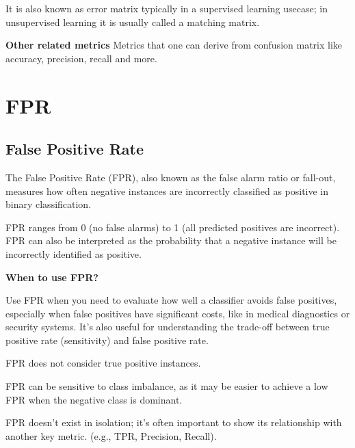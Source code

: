 {It is also known as error matrix typically in a supervised learning usecase; in unsupervised learning it is usually called a matching matrix. 
}

\textbf{Other related metrics}
Metrics that one can derive from confusion matrix like accuracy, precision, recall and more. 




\clearpage
\section{FPR}
\subsection{False Positive Rate}
\thispagestyle{classificationstyle}

The False Positive Rate (FPR), also known as the false alarm ratio or fall-out, measures how often negative instances are incorrectly classified as positive in binary classification.

\begin{center}
\end{center}

FPR ranges from 0 (no false alarms) to 1 (all predicted positives are incorrect). FPR can also be interpreted as the probability that a negative instance will be incorrectly identified as positive.

\textbf{When to use FPR?}

Use FPR when you need to evaluate how well a classifier avoids false positives, especially when false positives have significant costs, like in medical diagnostics or security systems. It's also useful for understanding the trade-off between true positive rate (sensitivity) and false positive rate.

{
\item FPR does not consider true positive instances.
\item FPR can be sensitive to class imbalance, as it may be easier to achieve a low FPR when the negative class is dominant.
\item FPR doesn't exist in isolation; it's often important to show its relationship with another key metric. (e.g., TPR, Precision, Recall).
}


